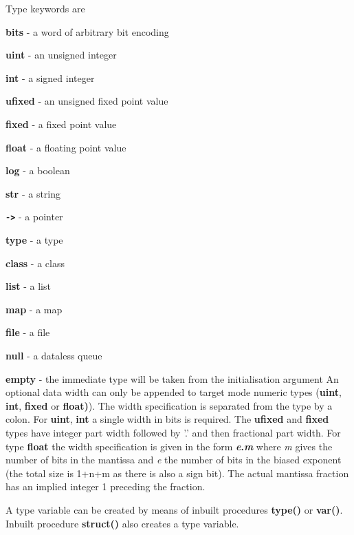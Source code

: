             Type keywords are
            \blist
            \item   {\bf bits} - a word of arbitrary bit encoding
            \item   {\bf uint} - an unsigned integer
            \item   {\bf int} - a signed integer
            \item   {\bf ufixed} - an unsigned fixed point value
            \item   {\bf fixed} - a fixed point value
            \item   {\bf float} - a floating point value
            \item   {\bf log} - a boolean
            \item   {\bf str} - a string
            \item   {\bf \verb'->'} - a pointer
            \item   {\bf type} - a type
            \item   {\bf class} - a class
            \item   {\bf list} - a list
            \item   {\bf map} - a map
            \item   {\bf file} - a file
            \item   {\bf null} - a dataless queue
            \item   {\bf empty} - the immediate type will be taken from the
                                  initialisation argument
            \blend
            An optional data width can only be appended to target mode numeric
            types ({\bf uint}, {\bf int}, {\bf fixed} or {\bf float)}). The
            width specification is separated from the type by a colon. For {\bf
            uint}, {\bf int} a single width in bits is required. The {\bf
            ufixed} and {\bf fixed} types have integer part width followed by
            '.' and then fractional part width. For type {\bf float} the width
            specification is given in the form {\bf {\em e}.{\em m}} where {\em
            m} gives the number of bits in the mantissa and {\em e} the number
            of bits in the biased exponent (the total size is 1+n+m as there is
            also a sign bit). The actual mantissa fraction has an implied
            integer 1 preceding the fraction.
            
            A type variable can be created by means of inbuilt procedures {\bf
            type()} or {\bf var()}. Inbuilt procedure {\bf struct()} also creates a
            type variable.
            
